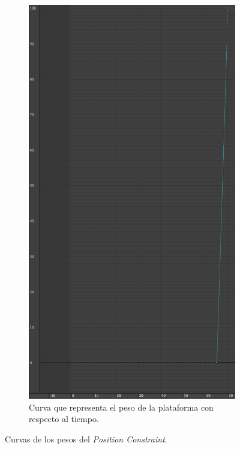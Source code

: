 \begin{figure}[H]
   \hfill
    \begin{subfigure}[t]{0.27\textwidth}
       \centering
       \includegraphics[width=\textwidth]{imagenes/espada/peso2.png}
       \caption{Curva que representa el peso de la plataforma con respecto al tiempo.}
    \end{subfigure}
    \caption{Curvas de los pesos del \textit{Position Constraint}.}
\end{figure}

